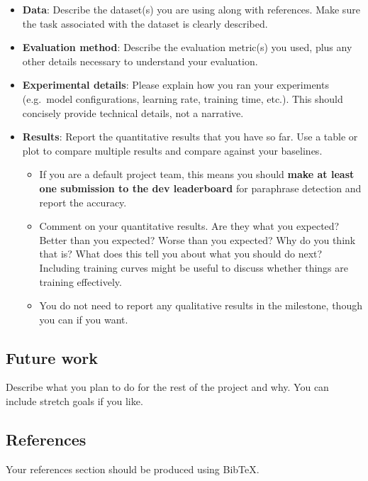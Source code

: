 \documentclass[11pt,a4paper]{article}
\begin{document}
\begin{itemize}[nosep]
    \item \textbf{Data}: Describe the dataset(s) you are using along with references. Make sure the task associated with the dataset is clearly described.
    \item \textbf{Evaluation method}: Describe the evaluation metric(s) you used, plus any other details necessary to understand your evaluation.
    \item \textbf{Experimental details}: Please explain how you ran your experiments (e.g.\ model configurations, learning rate, training time, etc.). This should concisely provide technical details, not a narrative.
    \item \textbf{Results}: Report the quantitative results that you have so far. Use a table or plot to compare multiple results and compare against your baselines.
    \begin{itemize}[nosep]
        \item If you are a default project team, this means you should \textbf{make at least one submission to the dev leaderboard} for paraphrase detection and report the accuracy.
        \item Comment on your quantitative results. Are they what you expected? Better than you expected? Worse than you expected? Why do you think that is? What does this tell you about what you should do next? Including training curves might be useful to discuss whether things are training effectively.
        \item You do not need to report any qualitative results in the milestone, though you can if you want.
    \end{itemize}
\end{itemize}

\subsection*{Future work}

Describe what you plan to do for the rest of the project and why. You can include stretch goals if you like.

\subsection*{References}

Your references section should be produced using Bib\TeX.


\end{document}
